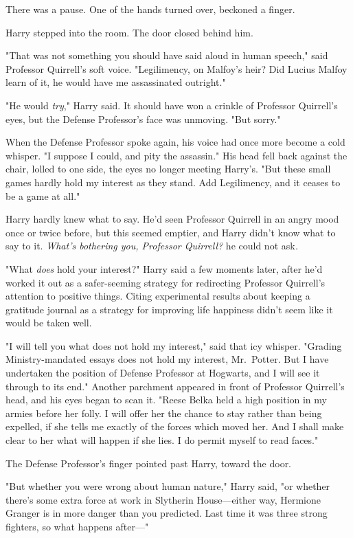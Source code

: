 There was a pause. One of the hands turned over, beckoned a finger.

Harry stepped into the room. The door closed behind him.

"That was not something you should have said aloud in human speech," said 
Professor Quirrell's soft voice. "Legilimency, on Malfoy's heir? Did Lucius 
Malfoy learn of it, he would have me assassinated outright."

"He would \emph{try}," Harry said. It should have won a crinkle of Professor 
Quirrell's eyes, but the Defense Professor's face was unmoving. "But sorry."

When the Defense Professor spoke again, his voice had once more become a cold 
whisper. "I suppose I could, and pity the assassin." His head fell back against 
the chair, lolled to one side, the eyes no longer meeting Harry's. "But these 
small games hardly hold my interest as they stand. Add Legilimency, and it 
ceases to be a game at all."

Harry hardly knew what to say. He'd seen Professor Quirrell in an angry mood 
once or twice before, but this seemed emptier, and Harry didn't know what to 
say to it. \emph{What's bothering you, Professor Quirrell?} he could not 
ask\emph{.}

"What \emph{does} hold your interest?" Harry said a few moments later, after 
he'd worked it out as a safer-seeming strategy for redirecting Professor 
Quirrell's attention to positive things. Citing experimental results about 
keeping a gratitude journal as a strategy for improving life happiness didn't 
seem like it would be taken well.

"I will tell you what does not hold my interest," said that icy whisper. 
"Grading Ministry-mandated essays does not hold my interest, Mr.~Potter. But I 
have undertaken the position of Defense Professor at Hogwarts, and I will see 
it through to its end." Another parchment appeared in front of Professor 
Quirrell's head, and his eyes began to scan it. "Reese Belka held a high 
position in my armies before her folly. I will offer her the chance to stay 
rather than being expelled, if she tells me exactly of the forces which moved 
her. And I shall make clear to her what will happen if she lies. I do permit 
myself to read faces."

The Defense Professor's finger pointed past Harry, toward the door.

"But whether you were wrong about human nature," Harry said, "or whether 
there's some extra force at work in Slytherin House---either way, Hermione 
Granger is in more danger than you predicted. Last time it was three strong 
fighters, so what happens after---"

